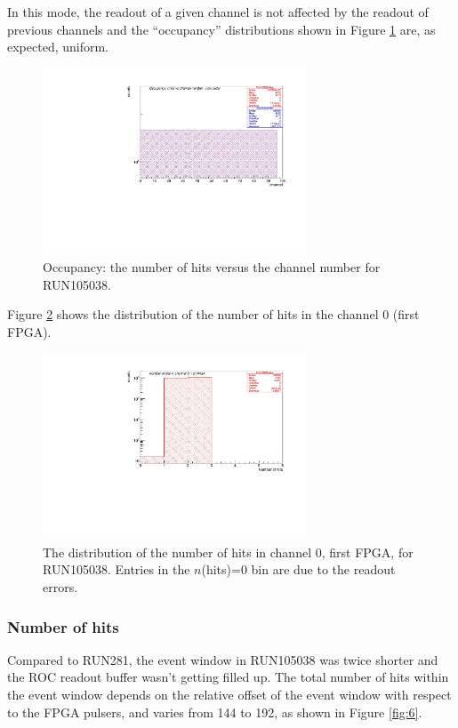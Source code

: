 In this mode, the readout of a given channel is not affected by the readout of previous
channels and the ``occupancy'' distributions shown in Figure \ref{fig:5} are, as expected, uniform.
\begin{figure}[!h]
\centering
\includegraphics[width =0.7\textwidth]{figures/pdf/figure_00002_nhitsvschannel_roc_simulation_2.pdf}
\caption{Occupancy: the number of hits versus the channel number for RUN105038.}
\label{fig:5}
\end{figure}


Figure \ref{fig:67} shows the distribution of the number of hits in the channel 0 (first FPGA).
\begin{figure}[!h]
\centering
\includegraphics[width =0.7\textwidth]{figures/pdf/figure_00067_nhits_ch00_run105038.pdf}
\caption{
  The distribution of the number of hits in channel 0, first FPGA, for RUN105038.
  Entries in the $n$(hits)=0 bin are due to the readout errors.
}
\label{fig:67}
\end{figure}

\subsubsection{Number of hits}
Compared to RUN281, the event window in RUN105038 was twice shorter
and the ROC readout buffer wasn't getting filled up.
The total number of hits within the event window depends on the relative offset
of the event window with respect to the FPGA pulsers, and varies from
144 to 192, as shown in Figure \ref{fig:6}.

